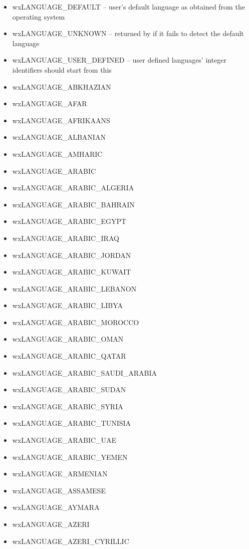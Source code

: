 \begin{itemize}\itemsep=0pt
\item wxLANGUAGE\_DEFAULT -- user's default language as obtained from the operating system 
\item wxLANGUAGE\_UNKNOWN -- returned by 
if it fails to detect the default language 
\item wxLANGUAGE\_USER\_DEFINED -- user defined languages' integer identifiers should start from
this
\item wxLANGUAGE\_ABKHAZIAN
\item wxLANGUAGE\_AFAR
\item wxLANGUAGE\_AFRIKAANS
\item wxLANGUAGE\_ALBANIAN
\item wxLANGUAGE\_AMHARIC
\item wxLANGUAGE\_ARABIC
\item wxLANGUAGE\_ARABIC\_ALGERIA
\item wxLANGUAGE\_ARABIC\_BAHRAIN
\item wxLANGUAGE\_ARABIC\_EGYPT
\item wxLANGUAGE\_ARABIC\_IRAQ
\item wxLANGUAGE\_ARABIC\_JORDAN
\item wxLANGUAGE\_ARABIC\_KUWAIT
\item wxLANGUAGE\_ARABIC\_LEBANON
\item wxLANGUAGE\_ARABIC\_LIBYA
\item wxLANGUAGE\_ARABIC\_MOROCCO
\item wxLANGUAGE\_ARABIC\_OMAN
\item wxLANGUAGE\_ARABIC\_QATAR
\item wxLANGUAGE\_ARABIC\_SAUDI\_ARABIA
\item wxLANGUAGE\_ARABIC\_SUDAN
\item wxLANGUAGE\_ARABIC\_SYRIA
\item wxLANGUAGE\_ARABIC\_TUNISIA
\item wxLANGUAGE\_ARABIC\_UAE
\item wxLANGUAGE\_ARABIC\_YEMEN
\item wxLANGUAGE\_ARMENIAN
\item wxLANGUAGE\_ASSAMESE
\item wxLANGUAGE\_AYMARA
\item wxLANGUAGE\_AZERI
\item wxLANGUAGE\_AZERI\_CYRILLIC

\end{itemize}
